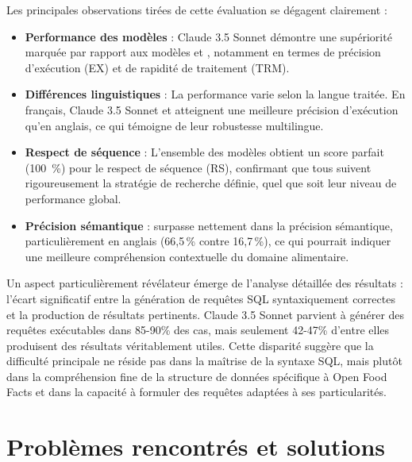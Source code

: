 \documentclass[a4paper,11pt]{article}
\begin{document}
Les principales observations tirées de cette évaluation se dégagent clairement :

\begin{itemize}
\item \textbf{Performance des modèles} : Claude 3.5 Sonnet démontre une supériorité marquée par rapport aux modèles  et , notamment en termes de précision d'exécution (EX) et de rapidité de traitement (TRM).

\item \textbf{Différences linguistiques} : La performance varie selon la langue traitée. En français, Claude 3.5 Sonnet et  atteignent une meilleure précision d'exécution qu'en anglais, ce qui témoigne de leur robustesse multilingue.

\item \textbf{Respect de séquence} : L'ensemble des modèles obtient un score parfait (100~\%) pour le respect de séquence (RS), confirmant que tous suivent rigoureusement la stratégie de recherche définie, quel que soit leur niveau de performance global.

\item \textbf{Précision sémantique} :  surpasse nettement  dans la précision sémantique, particulièrement en anglais (66,5\,\% contre 16,7\,\%), ce qui pourrait indiquer une meilleure compréhension contextuelle du domaine alimentaire.
\end{itemize}

Un aspect particulièrement révélateur émerge de l'analyse détaillée des résultats : l'écart significatif entre la génération de requêtes SQL syntaxiquement correctes et la production de résultats pertinents. Claude 3.5 Sonnet parvient à générer des requêtes exécutables dans 85-90\% des cas, mais seulement 42-47\% d'entre elles produisent des résultats véritablement utiles. Cette disparité suggère que la difficulté principale ne réside pas dans la maîtrise de la syntaxe SQL, mais plutôt dans la compréhension fine de la structure de données spécifique à Open Food Facts et dans la capacité à formuler des requêtes adaptées à ses particularités.



\section{Problèmes rencontrés et solutions}
\label{sec:problems}
\end{document}
